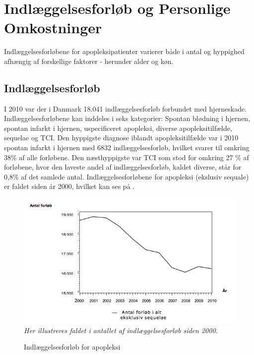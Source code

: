 \section{Indlæggelsesforløb og Personlige Omkostninger}
Indlæggelsesforløbene for apopleksipatienter varierer både i antal og hyppighed afhængig af forskellige faktorer - herunder alder og køn.

\subsection{Indlæggelsesforløb}
I 2010 var der i Danmark 18.041 indlæggelsesforløb forbundet med hjerneskade. Indlæggelsesforløbene kan inddeles i seks kategorier: Spontan blødning i hjernen, spontan infarkt i hjernen, uspecificeret apopleksi, diverse apopleksitilfælde, sequelae og TCI.  Den hyppigste diagnose iblandt apopleksitilfælde var i 2010 spontan infarkt i hjernen med 6832 indlæggelsesforløb, hvilket svarer til omkring 38\% af alle forløbene. Den næsthyppigste var TCI som stod for omkring 27 \% af forløbene, hvor den laveste andel af indlæggelsesforløb, kaldet diverse, står for 0,8\% af det samlede antal.  Indlæggelsesforløbene for apopleksi (ekslusiv sequale) er faldet siden år 2000, hvilket kan ses på .\cite{Sundhedsstyrelsen2011}

\begin{figure}[H]
	\caption{Indlæggelsesforløb for apopleksi}
	\label{Indlaeggelser}
	\centering
	\includegraphics[scale=.5]{figures/bProblemanalyse/Figur1}
	\flushleft
	\textit{Her illustreres faldet i antallet af indlæggelsesforløb siden 2000.}
\end{figure}

